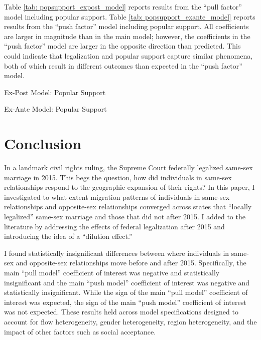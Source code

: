\documentclass[12pt,letterpaper]{article}
\begin{document}
Table \ref{tab: popsupport_expost_model} reports results from the “pull factor” model including popular support. Table \ref{tab: popsupport_exante_model} reports results from the “push factor” model including popular support. All coefficients are larger in magnitude than in the main model; however, the coefficients in the “push factor” model are larger in the opposite direction than predicted. This could indicate that legalization and popular support capture similar phenomena, both of which result in different outcomes than expected in the “push factor” model.

\begin{table}[h] %
    \centering
    \caption{Ex-Post Model: Popular Support}
    \label{tab: popsupport_expost_model}
    
\end{table}
\begin{table}[h]
    \centering
    \caption{Ex-Ante Model: Popular Support}
    \label{tab: popsupport_exante_model}
    
\end{table}

\section{Conclusion}

In a landmark civil rights ruling, the Supreme Court federally legalized same-sex marriage in 2015. This begs the question, how did individuals in same-sex relationships respond to the geographic expansion of their rights? In this paper, I investigated to what extent migration patterns of individuals in same-sex relationships and opposite-sex relationships converged across states that “locally legalized” same-sex marriage and those that did not after 2015. I added to the literature by addressing the effects of federal legalization after 2015 and introducing the idea of a “dilution effect.”

I found statistically insignificant differences between where individuals in same-sex and opposite-sex relationships move before and after 2015. Specifically, the main “pull model” coefficient of interest was negative and statistically insignificant and the main “push model” coefficient of interest was negative and statistically insignificant. While the sign of the main “pull model” coefficient of interest was expected, the sign of the main “push model” coefficient of interest was not expected. These results held across model specifications designed to account for flow heterogeneity, gender heterogeneity, region heterogeneity, and the impact of other factors such as social acceptance. 
\end{document}
